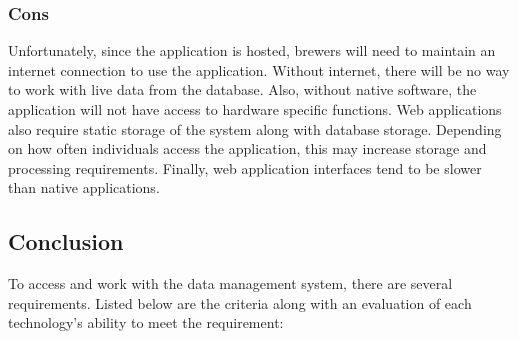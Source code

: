 \documentclass[draftclsnofoot,onecolumn,letterpaper,10pt,compsoc]{IEEEtran}
\begin{document}
        \subsubsection{Cons}
            Unfortunately, since the application is hosted, brewers will need to maintain an internet connection to use the application.
            Without internet, there will be no way to work with live data from the database.
            Also, without native software, the application will not have access to hardware specific functions.
            Web applications also require static storage of the system along with database storage.
            Depending on how often individuals access the application, this may increase storage and processing requirements.
            Finally, web application interfaces tend to be slower than native applications\cite{LifeWireOverview}.

    \subsection{Conclusion}
    To access and work with the data management system, there are several requirements. Listed below are the criteria along with an evaluation of each technology's ability to meet the requirement:\\
        
\end{document}
